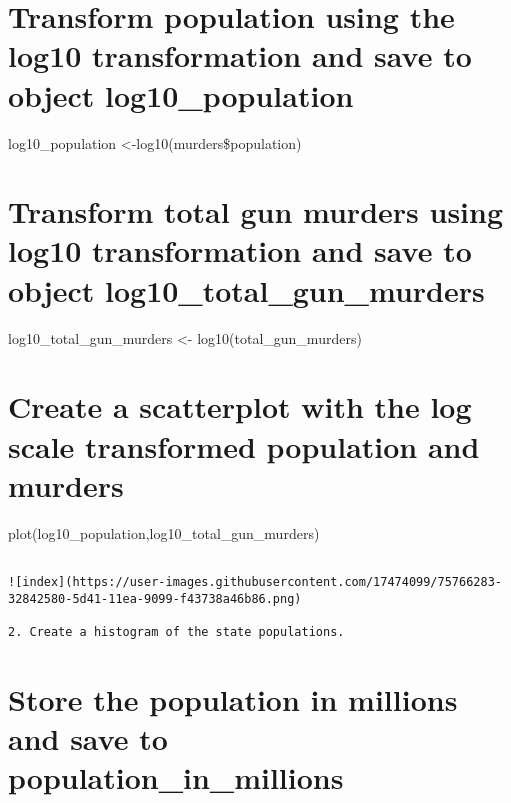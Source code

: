 \documentclass[
]{article}
\begin{document}
\hypertarget{transform-population-using-the-log10-transformation-and-save-to-object-log10_population}{%
\section{Transform population using the log10 transformation and save to
object
log10\_population}\label{transform-population-using-the-log10-transformation-and-save-to-object-log10_population}}

log10\_population \textless-log10(murders\$population)

\hypertarget{transform-total-gun-murders-using-log10-transformation-and-save-to-object-log10_total_gun_murders}{%
\section{Transform total gun murders using log10 transformation and save
to object
log10\_total\_gun\_murders}\label{transform-total-gun-murders-using-log10-transformation-and-save-to-object-log10_total_gun_murders}}

log10\_total\_gun\_murders \textless- log10(total\_gun\_murders)

\hypertarget{create-a-scatterplot-with-the-log-scale-transformed-population-and-murders}{%
\section{Create a scatterplot with the log scale transformed population
and
murders}\label{create-a-scatterplot-with-the-log-scale-transformed-population-and-murders}}

plot(log10\_population,log10\_total\_gun\_murders)

\begin{verbatim}

![index](https://user-images.githubusercontent.com/17474099/75766283-32842580-5d41-11ea-9099-f43738a46b86.png)

2. Create a histogram of the state populations.
\end{verbatim}

\hypertarget{store-the-population-in-millions-and-save-to-population_in_millions}{%
\section{Store the population in millions and save to
population\_in\_millions}\label{store-the-population-in-millions-and-save-to-population_in_millions}}
\end{document}

